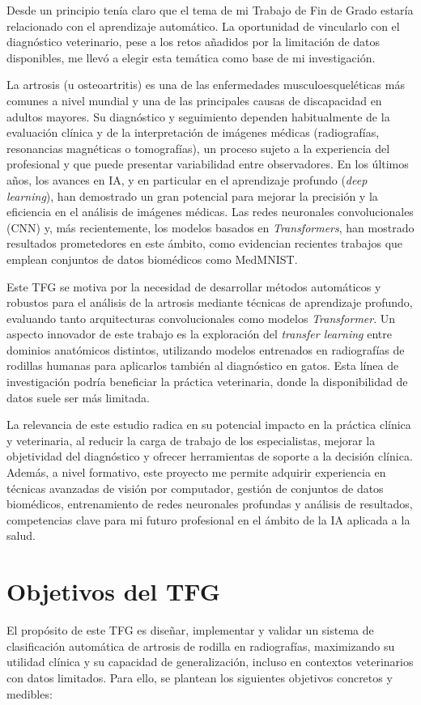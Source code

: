 \documentclass[11pt,spanish,listoffigures,listoftables]{tfgetsinf}
\begin{document}
Desde un principio tenía claro que el tema de mi Trabajo de Fin de Grado estaría relacionado con el aprendizaje automático. La oportunidad de vincularlo con el diagnóstico veterinario, pese a los retos añadidos por la limitación de datos disponibles, me llevó a elegir esta temática como base de mi investigación.

La artrosis (u osteoartritis) es una de las enfermedades musculoesqueléticas más comunes a nivel mundial y una de las principales causas de discapacidad en adultos mayores. Su diagnóstico y seguimiento dependen habitualmente de la evaluación clínica y de la interpretación de imágenes médicas (radiografías, resonancias magnéticas o tomografías), un proceso sujeto a la experiencia del profesional y que puede presentar variabilidad entre observadores. En los últimos años, los avances en IA, y en particular en el aprendizaje profundo (\textit{deep learning}), han demostrado un gran potencial para mejorar la precisión y la eficiencia en el análisis de imágenes médicas. Las redes neuronales convolucionales (CNN) y, más recientemente, los modelos basados en \textit{Transformers}, han mostrado resultados prometedores en este ámbito, como evidencian recientes trabajos que emplean conjuntos de datos biomédicos como MedMNIST.

Este TFG se motiva por la necesidad de desarrollar métodos automáticos y robustos para el análisis de la artrosis mediante técnicas de aprendizaje profundo, evaluando tanto arquitecturas convolucionales como modelos \textit{Transformer}. Un aspecto innovador de este trabajo es la exploración del \textit{transfer learning} entre dominios anatómicos distintos, utilizando modelos entrenados en radiografías de rodillas humanas para aplicarlos también al diagnóstico en gatos. Esta línea de investigación podría beneficiar la práctica veterinaria, donde la disponibilidad de datos suele ser más limitada. 

La relevancia de este estudio radica en su potencial impacto en la práctica clínica y veterinaria, al reducir la carga de trabajo de los especialistas, mejorar la objetividad del diagnóstico y ofrecer herramientas de soporte a la decisión clínica. Además, a nivel formativo, este proyecto me permite adquirir experiencia en técnicas avanzadas de visión por computador, gestión de conjuntos de datos biomédicos, entrenamiento de redes neuronales profundas y análisis de resultados, competencias clave para mi futuro profesional en el ámbito de la IA aplicada a la salud.


\section{Objetivos del TFG}
El propósito de este TFG es diseñar, implementar y validar un sistema de clasificación automática de artrosis de rodilla en radiografías, maximizando su utilidad clínica y su capacidad de generalización, incluso en contextos veterinarios con datos limitados. Para ello, se plantean los siguientes objetivos concretos y medibles:
\end{document}
